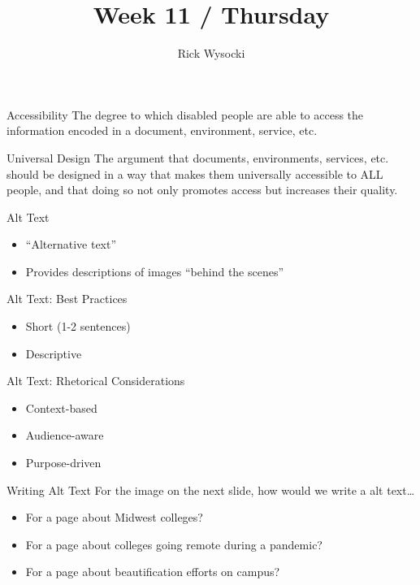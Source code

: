 \documentclass[presentation]{beamer}
\author{Rick Wysocki}
\date{}
\title{Week 11 / Thursday}
\begin{document}
\maketitle
\begin{frame}[label={sec:org44e7ce6}]{Accessibility}
The degree to which disabled people are able to access the information encoded in a document, environment, service, etc.
\end{frame}
\begin{frame}[label={sec:org236532c}]{Universal Design}
The argument that documents, environments, services, etc. should be designed in a way that makes them universally accessible to ALL people, and that doing so not only promotes access but increases their quality.
\end{frame}
\begin{frame}[label={sec:org59612c2}]{Alt Text}
\begin{itemize}
\item “Alternative text”
\item Provides descriptions of images “behind the scenes”
\end{itemize}
\end{frame}
\begin{frame}[label={sec:org7d1bc3f}]{Alt Text: Best Practices}
\begin{itemize}
\item Short (1-2 sentences)
\item Descriptive
\end{itemize}
\end{frame}
\begin{frame}[label={sec:org622c104}]{Alt Text: Rhetorical Considerations}
\begin{itemize}
\item Context-based
\item Audience-aware
\item Purpose-driven
\end{itemize}
\end{frame}
\begin{frame}[label={sec:orge9296ac}]{Writing Alt Text}
For the image on the next slide, how would we write a alt text\ldots{} 
\begin{itemize}
\item For a page about Midwest colleges?
\item For a page about colleges going remote during a pandemic?
\item For a page about beautification efforts on campus?
\end{itemize}
\end{frame}
\end{document}
